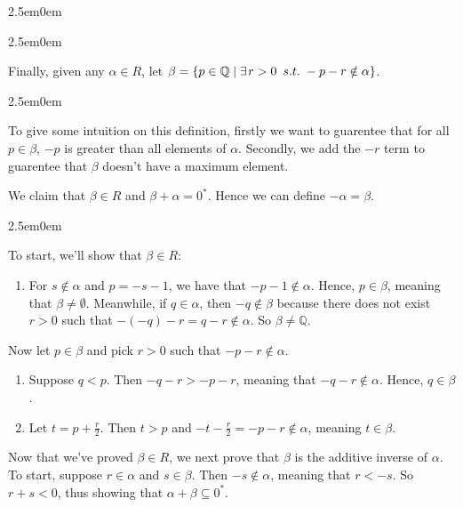 \documentclass{book}
\newcommand{\myComment}{%
   \color{RawerSienna}%
   \fontsize{12}{14}\selectfont%
}
\newcommand{\exP}{%
   \color{Purple}%
   \fontsize{12}{14}\selectfont%
}
\newenvironment{myIndent}{%
   \begin{adjustwidth}{2.5em}{0em}%
}{%
   \end{adjustwidth}%
}
\newcommand{\suchthat}{ \hspace{0.5em}s.t.\hspace{0.3em}}
\newcommand{\retTwo}{\hfill\bigbreak}
\begin{document}
\begin{myIndent}
\begin{myIndent}
         Finally, given any $\alpha \in R$, let $\beta = \{p \in \mathbb{Q} \mid \exists\hspace{0.1em} r > 0 \suchthat -p-r \notin \alpha\}$.
         \begin{myIndent}\myComment
            To give some intuition on this definition, firstly we want to guarentee that for all $p \in \beta$, $-p$ is greater than all elements of $\alpha$. Secondly, we add the $-r$ term to guarentee that $\beta$ doesn't have a maximum element.\\
         \end{myIndent}

         We claim that $\beta \in R$ and $\beta + \alpha = 0^*$. Hence we can define $-\alpha = \beta$.

         \begin{myIndent}\exP
            To start, we'll show that $\beta \in R$:
            \begin{enumerate}
               \item For $s \notin \alpha$ and $p = -s - 1$, we have that $-p - 1 \notin \alpha$. Hence, $p \in \beta$, meaning that $\beta \neq \emptyset$. Meanwhile, if $q \in \alpha$, then $-q \notin \beta$ because there does not exist $r > 0$ such that $-(-q) - r = q - r \notin \alpha$. So $\beta \neq \mathbb{Q}$.\\ [-6pt]
            \end{enumerate}

            Now let $p \in \beta$ and pick $r > 0$ such that $-p -r \notin \alpha$.\newpage

            \begin{enumerate}
               \item[2.] Suppose $q < p$. Then $-q - r > -p - r$, meaning that $-q - r \notin \alpha$. Hence, $q \in \beta$.\retTwo
               
               \item[3.] Let $t = p + \frac{r}{2}$. Then $t > p$ and $-t - \frac{r}{2} = -p - r \notin \alpha$, meaning $t \in \beta$.\retTwo
            \end{enumerate}

            Now that we've proved $\beta \in R$, we next prove that $\beta$ is the additive inverse of $\alpha$. To start, suppose $r \in \alpha$ and $s \in \beta$. Then $-s \notin \alpha$, meaning that $r < -s$. So $r + s < 0$, thus showing that $\alpha + \beta \subseteq 0^*$.
         \end{myIndent}

      \end{myIndent}

   \end{myIndent}

   


   
\end{document}
